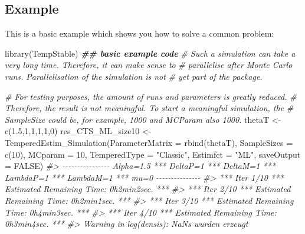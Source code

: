 \documentclass[
]{article}
\newenvironment{Shaded}{\begin{snugshade}}{\end{snugshade}}
\newcommand{\AttributeTok}[1]{\textcolor[rgb]{0.77,0.63,0.00}{#1}}
\newcommand{\CommentTok}[1]{\textcolor[rgb]{0.56,0.35,0.01}{\textit{#1}}}
\newcommand{\ConstantTok}[1]{\textcolor[rgb]{0.00,0.00,0.00}{#1}}
\newcommand{\DecValTok}[1]{\textcolor[rgb]{0.00,0.00,0.81}{#1}}
\newcommand{\DocumentationTok}[1]{\textcolor[rgb]{0.56,0.35,0.01}{\textbf{\textit{#1}}}}
\newcommand{\FloatTok}[1]{\textcolor[rgb]{0.00,0.00,0.81}{#1}}
\newcommand{\FunctionTok}[1]{\textcolor[rgb]{0.00,0.00,0.00}{#1}}
\newcommand{\NormalTok}[1]{#1}
\newcommand{\OtherTok}[1]{\textcolor[rgb]{0.56,0.35,0.01}{#1}}
\newcommand{\StringTok}[1]{\textcolor[rgb]{0.31,0.60,0.02}{#1}}
\begin{document}
\hypertarget{example}{%
\subsection{Example}\label{example}}

This is a basic example which shows you how to solve a common problem:

\begin{Shaded}
\begin{Highlighting}[]
\FunctionTok{library}\NormalTok{(TempStable)}
\DocumentationTok{\#\# basic example code}
\CommentTok{\# Such a simulation can take a very long time. Therefore, it can make sense to }
\CommentTok{\# parallelise after Monte Carlo runs. Parallelisation of the simulation is not }
\CommentTok{\# yet part of the package. }

\CommentTok{\# For testing purposes, the amount of runs and parameters is greatly reduced. }
\CommentTok{\# Therefore, the result is not meaningful. To start a meaningful simulation, the}
\CommentTok{\# SampleSize could be, for example, 1000 and MCParam also 1000.}
\NormalTok{thetaT }\OtherTok{\textless{}{-}} \FunctionTok{c}\NormalTok{(}\FloatTok{1.5}\NormalTok{,}\DecValTok{1}\NormalTok{,}\DecValTok{1}\NormalTok{,}\DecValTok{1}\NormalTok{,}\DecValTok{1}\NormalTok{,}\DecValTok{0}\NormalTok{)}
\NormalTok{res\_CTS\_ML\_size10 }\OtherTok{\textless{}{-}} \FunctionTok{TemperedEstim\_Simulation}\NormalTok{(}\AttributeTok{ParameterMatrix =} \FunctionTok{rbind}\NormalTok{(thetaT),}
                                               \AttributeTok{SampleSizes =} \FunctionTok{c}\NormalTok{(}\DecValTok{10}\NormalTok{), }\AttributeTok{MCparam =} \DecValTok{10}\NormalTok{,}
                                               \AttributeTok{TemperedType =} \StringTok{"Classic"}\NormalTok{, }\AttributeTok{Estimfct =} \StringTok{"ML"}\NormalTok{,}
                                               \AttributeTok{saveOutput =} \ConstantTok{FALSE}\NormalTok{)}
\CommentTok{\#\textgreater{} {-}{-}{-}{-}{-}{-}{-}{-}{-}{-}{-}{-}{-}{-}{-}{-} Alpha=1.5 *** DeltaP=1 *** DeltaM=1 *** LambdaP=1 *** LambdaM=1 *** mu=0 {-}{-}{-}{-}{-}{-}{-}{-}{-}{-}{-}{-}{-}{-}{-} }
\CommentTok{\#\textgreater{} *** Iter 1/10 *** Estimated Remaining Time: 0h2min2sec. *** }
\CommentTok{\#\textgreater{} *** Iter 2/10 *** Estimated Remaining Time: 0h2min1sec. *** }
\CommentTok{\#\textgreater{} *** Iter 3/10 *** Estimated Remaining Time: 0h4min3sec. *** }
\CommentTok{\#\textgreater{} *** Iter 4/10 *** Estimated Remaining Time: 0h3min4sec. ***}
\CommentTok{\#\textgreater{} Warning in log(densis): NaNs wurden erzeugt}


\end{Highlighting}
\end{Shaded}
\end{document}
